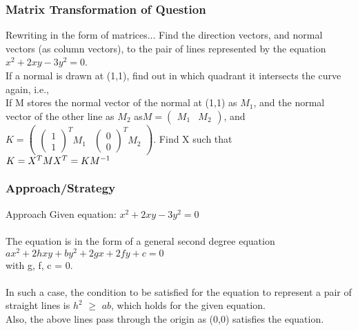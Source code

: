 \documentclass{beamer}
\begin{document}
\begin{frame}
\frametitle{Matrix Transformation of Question}
\begin{block}{Rewriting in the form of matrices...}
Find the direction vectors, and normal vectors (as column vectors), to the pair of lines represented by the equation $x^2 + 2xy - 3y^2 = 0$. \\
If a normal is drawn at (1,1), find out in which quadrant it intersects the curve again, i.e.,\\
If M stores the normal vector of the normal at (1,1) as $M_1$, and the normal vector of the other line as $M_2$ as$M = \begin{pmatrix} M_1 & M_2 \end{pmatrix}$, and \\
$K = \begin{pmatrix} \begin{pmatrix} 1 \\ 1 \end{pmatrix}^T M_1 & \begin{pmatrix}0\\0\end{pmatrix}^T M_2 \end{pmatrix}$. 
Find X such that \\
$K = X^T M \\
X^T = KM^{-1}$
\end{block}
\end{frame}


\begin{frame}
\frametitle{Approach/Strategy}
\begin{block}{Approach}
Given equation: $x^2 + 2xy - 3y^2 = 0$ \\
\\
The equation is in the form of a general second degree equation \\
$ax^2 + 2hxy + by^2 + 2gx + 2fy + c = 0$ \\
with g, f, c = 0. \\ 
\\
In such a case, the condition to be satisfied for the equation to represent a pair of straight lines is $h^2$ $\geq$ $ab$, which holds for the given equation. \\
Also, the above lines pass through the origin as (0,0) satisfies the equation. 
\end{block}
\end{frame}
\end{document}

